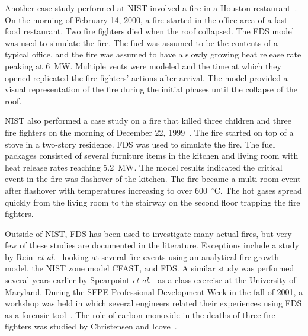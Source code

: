 Another case study performed at NIST involved a fire in a Houston restaurant~\cite{Texas}. On the morning of February 14, 2000, a fire started in the
office area of a fast food restaurant. Two fire fighters died when the roof collapsed. The FDS model was used to simulate the fire. The fuel was
assumed to be the contents of a typical office, and the fire was assumed to have a slowly growing heat release rate peaking at 6~MW. Multiple vents
were modeled and the time at which they opened replicated the fire fighters' actions after arrival.  The model provided a visual representation of
the fire during the initial phases until the collapse of the roof.

NIST also performed a case study on a fire that killed three children and three fire fighters on the morning of December 22, 1999~\cite{Iowa}. The
fire started on top of a stove in a two-story residence. FDS was used to simulate the fire.  The fuel packages consisted of several furniture items
in the kitchen and living room with heat release rates reaching 5.2~MW. The model results indicated the critical event in the fire was flashover of
the kitchen. The fire became a multi-room event after flashover with temperatures increasing to over 600~$^\circ$C. The hot gases spread quickly from
the living room to the stairway on the second floor trapping the fire fighters.

Outside of NIST, FDS has been used to investigate many actual fires, but very few of these studies are documented in the literature. Exceptions
include a study by Rein~{\em et al.}~\cite{Rein:Interflam2004} looking at several fire events using an analytical fire growth model, the NIST zone
model CFAST, and FDS. A similar study was performed several years earlier by Spearpoint {\em et al.}~\cite{Spearpoint:ICFRE3} as a class exercise at
the University of Maryland. During the SFPE Professional Development Week in the fall of 2001, a workshop was held in which several engineers related
their experiences using FDS as a forensic tool~\cite{Carpenter:SFPE2001}. The role of carbon monoxide in the deaths of three fire fighters was
studied by Christensen and Icove~\cite{Christensen:JFS}.
